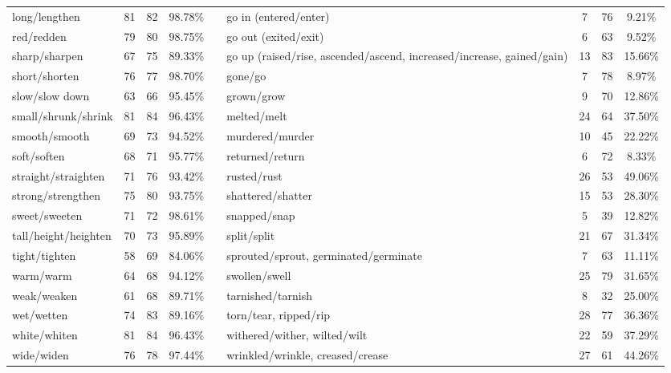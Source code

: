 \begin{tabular}{p{3cm}ccccp{3cm}ccc}
long/lengthen & 81 & 82 & 98.78\% & & go in (entered/enter) & 7 & 76 & 9.21\% \\
red/redden & 79 & 80 & 98.75\% & & go out (exited/exit) & 6 & 63 & 9.52\% \\
sharp/sharpen & 67 & 75 & 89.33\% & & go up (raised/rise, ascended/ascend, increased/increase, gained/gain) & 13 & 83 & 15.66\% \\
short/shorten & 76 & 77 & 98.70\% & & gone/go & 7 & 78 & 8.97\% \\
slow/slow down & 63 & 66 & 95.45\% & & grown/grow & 9 & 70 & 12.86\% \\
small/shrunk/shrink & 81 & 84 & 96.43\% & & melted/melt & 24 & 64 & 37.50\% \\
smooth/smooth & 69 & 73 & 94.52\% & & murdered/murder & 10 & 45 & 22.22\% \\
soft/soften & 68 & 71 & 95.77\% & & returned/return & 6 & 72 & 8.33\% \\
straight/straighten & 71 & 76 & 93.42\% & & rusted/rust & 26 & 53 & 49.06\% \\
strong/strengthen & 75 & 80 & 93.75\% & & shattered/shatter & 15 & 53 & 28.30\% \\
sweet/sweeten & 71 & 72 & 98.61\% & & snapped/snap & 5 & 39 & 12.82\% \\
tall/height/heighten & 70 & 73 & 95.89\% & & split/split & 21 & 67 & 31.34\% \\
tight/tighten & 58 & 69 & 84.06\% & & sprouted/sprout, germinated/germinate & 7 & 63 & 11.11\% \\
warm/warm & 64 & 68 & 94.12\% & & swollen/swell & 25 & 79 & 31.65\% \\
weak/weaken & 61 & 68 & 89.71\% & & tarnished/tarnish & 8 & 32 & 25.00\% \\
wet/wetten & 74 & 83 & 89.16\% & & torn/tear, ripped/rip & 28 & 77 & 36.36\% \\
white/whiten & 81 & 84 & 96.43\% & & withered/wither, wilted/wilt & 22 & 59 & 37.29\% \\
wide/widen & 76 & 78 & 97.44\% & & wrinkled/wrinkle, creased/crease & 27 & 61 & 44.26\%
\end{tabular}